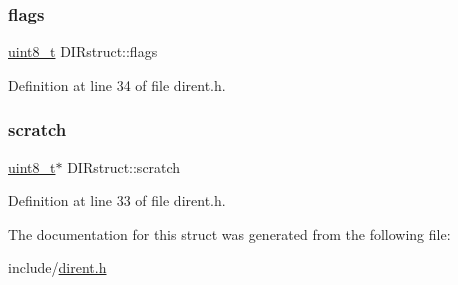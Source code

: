 \subsubsection{\texorpdfstring{flags}{flags}}
{\footnotesize\ttfamily \mbox{\hyperlink{stdint_8h_aba7bc1797add20fe3efdf37ced1182c5}{uint8\+\_\+t}} D\+I\+Rstruct\+::flags}



Definition at line 34 of file dirent.\+h.

\mbox{\label{structDIRstruct_acc1294d144a7338ac671f90dc47582f6}} 
\subsubsection{\texorpdfstring{scratch}{scratch}}
{\footnotesize\ttfamily \mbox{\hyperlink{stdint_8h_aba7bc1797add20fe3efdf37ced1182c5}{uint8\+\_\+t}}$\ast$ D\+I\+Rstruct\+::scratch}



Definition at line 33 of file dirent.\+h.



The documentation for this struct was generated from the following file\+:\begin{DoxyCompactItemize}
\item 
include/\mbox{\hyperlink{dirent_8h}{dirent.\+h}}\end{DoxyCompactItemize}
